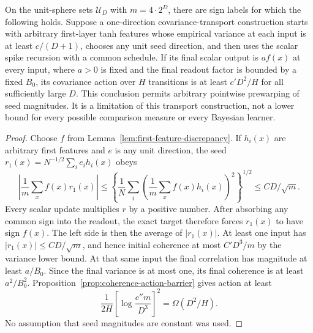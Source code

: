 \begin{corollary}
\label{cor:worst-seed-barrier}
On the unit-sphere sets $\mathcal U_D$ with $m=4\cdot2^D$, there are sign labels for which the following holds. Suppose a one-direction covariance-transport construction starts with arbitrary first-layer tanh features whose empirical variance at each input is at least $c/(D+1)$, chooses any unit seed direction, and then uses the scalar spike recursion with a common schedule. If its final scalar output is $a f(x)$ at every input, where $a>0$ is fixed and the final readout factor is bounded by a fixed $B_0$, its covariance action over $H$ transitions is at least $c' D^2/H$ for all sufficiently large $D$.
This conclusion permits arbitrary pointwise prewarping of seed magnitudes. It is a limitation of this transport construction, not a lower bound for every possible comparison measure or every Bayesian learner.
\end{corollary}
\begin{proof}
Choose $f$ from Lemma~\ref{lem:first-feature-discrepancy}. If $h_i(x)$ are arbitrary first features and $e$ is any unit direction, the seed $r_1(x)=N^{-1/2}\sum_i e_i h_i(x)$ obeys
\[
 \left|\frac1m\sum_x f(x)r_1(x)\right|
 \le\left\{\frac1N\sum_i
       \left(\frac1m\sum_x f(x)h_i(x)\right)^2\right\}^{1/2}
 \le C D/\sqrt m.
\]
Every scalar update multiplies $r$ by a positive number. After absorbing any common sign into the readout, the exact target therefore forces $r_1(x)$ to have sign $f(x)$. The left side is then the average of $|r_1(x)|$. At least one input has $|r_1(x)|\le CD/\sqrt m$, and hence initial coherence at most $C'D^3/m$ by the variance lower bound. At that same input the final correlation has magnitude at least $a/B_0$. Since the final variance is at most one, its final coherence is at least $a^2/B_0^2$. Proposition~\ref{prop:coherence-action-barrier} gives action at least
\[
 \frac1{2H}\left[\log\frac{c''m}{D^3}\right]^2
 =\Omega(D^2/H).
\]
No assumption that seed magnitudes are constant was used.
\end{proof}
